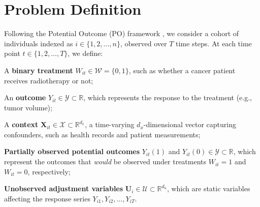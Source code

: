 \documentclass[10pt]{article} %
\begin{document}
\section{Problem Definition}
\label{sect:problem_def}
Following the Potential Outcome (PO) framework \citep{robins2009estimation}, we consider a cohort of individuals indexed as $i \in \{1,2,\dots,n\}$, observed over $T$ time steps. At each time point $t \in \{1,2,\dots,T\}$, we define:
\begin{inparaenum}[(1)]
\item A \textbf{binary treatment} $W_{it} \in \mathcal{W} = \{0,1\}$, such as whether a cancer patient receives radiotherapy or not;
\item An \textbf{outcome} $Y_{it} \in \mathcal{Y} \subset \mathbb{R}$, which represents the response to the treatment (e.g., tumor volume);
\item A \textbf{context} $\mathbf{X}_{it} \in \mathcal{X} \subset \mathbb{R}^{d_x}$, a time-varying $d_x$-dimensional vector capturing confounders, such as health records and patient measurements;
\item \textbf{Partially observed potential outcomes} $Y_{it}(1)$ and $Y_{it}(0) \in \mathcal{Y} \subset \mathbb{R}$, which represent the outcomes that \emph{would} be observed under treatments $W_{it}=1$ and $W_{it}=0$, respectively; 
\item \textbf{Unobserved adjustment variables} $\mathbf{U}_i \in \mathcal{U} \subset \mathbb{R}^{d_u}$, which are static variables affecting the response series $Y_{i1}, Y_{i2}, \dots, Y_{iT}$.
\end{inparaenum}
\end{document}
